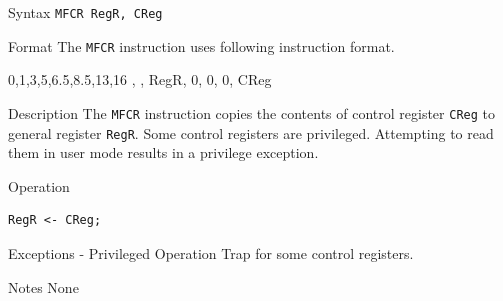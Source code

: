 %
%
\pagebreak
{}

\begin{iPageDescEntry}{Syntax}
\texttt{MFCR RegR, CReg}
\end{iPageDescEntry}

\begin{iPageDescEntry}{Format}
The \texttt{MFCR} instruction uses following instruction format. \\

\begin{flushleft}
\drawInstrFormat
    {0,1,3,5,6.5,8.5,13,16}
    {\OpCodeGrpSYS, \OpCodeMFCR, RegR, 0, 0, 0, CReg}
\end{flushleft}
\end{iPageDescEntry}

\begin{iPageDescEntry}{Description}
The \texttt{MFCR} instruction copies the contents of control register \texttt{CReg} to general register \texttt{RegR}. Some control registers are privileged. Attempting to read them in user mode results in a privilege exception.
\end{iPageDescEntry}

\begin{iPageDescOpEntry}{Operation}
\begin{lstlisting}[style=iPageOpStyle]
RegR <- CReg;
\end{lstlisting}
\end{iPageDescOpEntry}

\begin{iPageDescEntry}{Exceptions}
- Privileged Operation Trap for some control registers.
\end{iPageDescEntry}

\begin{iPageDescEntry}{Notes}
None
\end{iPageDescEntry}
